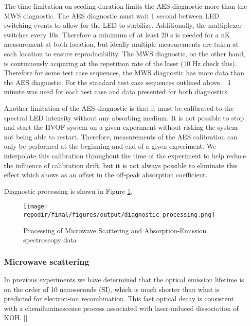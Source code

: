 The time limitation on seeding duration limits the AES diagnostic more than the MWS diagnostic. The AES diagnostic must wait 1 second between LED switching events to allow for the LED to stabilize. Additionally, the multiplexer switches every 10s. Therefore a minimum of at least 20 s is needed for a nK measurement at both location, but ideally multiple measurements are taken at each location to ensure reproducibility. The MWS diagnostic, on the other hand, is continuously acquiring at the repetition rate of the laser (10 Hz check this). Therefore for some test case sequences, the MWS diagnostic has more data than the AES diagnostic. For the standard test case sequences outlined above, ~1 minute was used for each test case and data presented for both diagnostics.  

Another limitation of the AES diagnostic is that it must be calibrated to the spectral LED intensity without any absorbing medium. It is not possible to stop and start the HVOF system on a given experiment without risking the system not being able to restart. Therefore, measurements of the AES calibration can only be performed at the beginning and end of a given experiment. We interpolate this calibration throughout the time of the experiment to help reduce the influence of calibration drift, but it is not always possible to eliminate this effect which shows as an offset in the off-peak absorption coefficient.




Diagnostic processing is shown in Figure \ref{fig:diagnostic_processing}.

\begin{figure}[h]
    \texttt{[image: \\repodir/final/figures/output/diagnostic\_processing.png]} 
    \caption{Processing of Microwave Scattering and Absorption-Emission spectroscopy data}
    \label{fig:diagnostic_processing}
\end{figure}


\subsubsection{Microwave scattering}

 In previous experiments we have determined that the optical emission lifetime is on the order of 10 nanoseconds (SI), which is much shorter than what is predicted for electron-ion recombination. This fast optical decay is consistent with a chemiluminescence process associated with laser-induced dissociation of KOH. [] 


